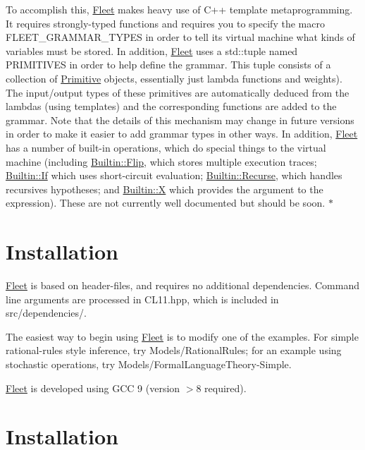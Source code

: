 To accomplish this, \hyperlink{class_fleet}{Fleet} makes heavy use of C++ template metaprogramming. It requires strongly-\/typed functions and requires you to specify the macro F\+L\+E\+E\+T\+\_\+\+G\+R\+A\+M\+M\+A\+R\+\_\+\+T\+Y\+P\+ES in order to tell its virtual machine what kinds of variables must be stored. In addition, \hyperlink{class_fleet}{Fleet} uses a std\+::tuple named P\+R\+I\+M\+I\+T\+I\+V\+ES in order to help define the grammar. This tuple consists of a collection of \hyperlink{struct_primitive}{Primitive} objects, essentially just lambda functions and weights). The input/output types of these primitives are automatically deduced from the lambdas (using templates) and the corresponding functions are added to the grammar. Note that the details of this mechanism may change in future versions in order to make it easier to add grammar types in other ways. In addition, \hyperlink{class_fleet}{Fleet} has a number of built-\/in operations, which do special things to the virtual machine (including \hyperlink{struct_builtin_1_1_flip}{Builtin\+::\+Flip}, which stores multiple execution traces; \hyperlink{struct_builtin_1_1_if}{Builtin\+::\+If} which uses short-\/circuit evaluation; \hyperlink{struct_builtin_1_1_recurse}{Builtin\+::\+Recurse}, which handles recursives hypotheses; and \hyperlink{struct_builtin_1_1_x}{Builtin\+::X} which provides the argument to the expression). These are not currently well documented but should be soon. $\ast$\hypertarget{index_install_sec}{}\section{Installation}\label{index_install_sec}
\hyperlink{class_fleet}{Fleet} is based on header-\/files, and requires no additional dependencies. Command line arguments are processed in C\+L11.\+hpp, which is included in src/dependencies/.

The easiest way to begin using \hyperlink{class_fleet}{Fleet} is to modify one of the examples. For simple rational-\/rules style inference, try Models/\+Rational\+Rules; for an example using stochastic operations, try Models/\+Formal\+Language\+Theory-\/\+Simple.

\hyperlink{class_fleet}{Fleet} is developed using G\+CC 9 (version $>$8 required).\hypertarget{index_install_sec}{}\section{Installation}\label{index_install_sec}

